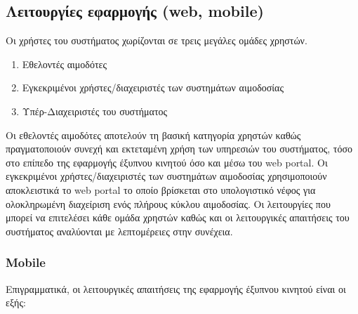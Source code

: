 	\subsection{Λειτουργίες εφαρμογής (web, mobile)}
Οι χρήστες του συστήματος χωρίζονται σε τρεις μεγάλες ομάδες χρηστών.

		\begin{enumerate}

			\item Εθελοντές αιμοδότες
			\item Εγκεκριμένοι χρήστες/διαχειριστές των συστημάτων αιμοδοσίας
			\item Υπέρ-Διαχειριστές του συστήματος

		\end{enumerate}
		
		Οι εθελοντές αιμοδότες αποτελούν τη βασική κατηγορία χρηστών καθώς πραγματοποιούν συνεχή και εκτεταμένη χρήση των υπηρεσιών του συστήματος, τόσο στο επίπεδο της εφαρμογής έξυπνου κινητού όσο και μέσω του web portal. Οι εγκεκριμένοι χρήστες/διαχειριστές των συστημάτων αιμοδοσίας χρησιμοποιούν αποκλειστικά το web portal το οποίο βρίσκεται στο υπολογιστικό νέφος για ολοκληρωμένη διαχείριση ενός πλήρους κύκλου αιμοδοσίας. Οι λειτουργίες που μπορεί να επιτελέσει κάθε ομάδα χρηστών καθώς και οι λειτουργικές απαιτήσεις του συστήματος αναλύονται με λεπτομέρειες στην συνέχεια.
		
		\subsubsection{Mobile} \label{sssec:functional_requirements_mobile}
			Επιγραμματικά, οι λειτουργικές απαιτήσεις της εφαρμογής έξυπνου κινητού είναι οι εξής:
			
